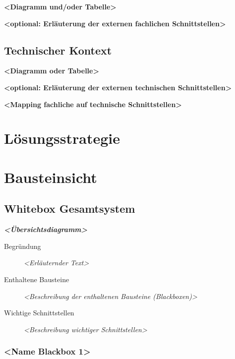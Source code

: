 \documentclass[
]{article}
\begin{document}
\textbf{\textless Diagramm und/oder Tabelle\textgreater{}}

\textbf{\textless optional: Erläuterung der externen fachlichen
Schnittstellen\textgreater{}}

\hypertarget{_technischer_kontext}{%
\subsection{Technischer Kontext}\label{_technischer_kontext}}

\textbf{\textless Diagramm oder Tabelle\textgreater{}}

\textbf{\textless optional: Erläuterung der externen technischen
Schnittstellen\textgreater{}}

\textbf{\textless Mapping fachliche auf technische
Schnittstellen\textgreater{}}

\hypertarget{section-solution-strategy}{%
\section{Lösungsstrategie}\label{section-solution-strategy}}

\hypertarget{section-building-block-view}{%
\section{Bausteinsicht}\label{section-building-block-view}}

\hypertarget{_whitebox_gesamtsystem}{%
\subsection{Whitebox Gesamtsystem}\label{_whitebox_gesamtsystem}}

\emph{\textbf{\textless Übersichtsdiagramm\textgreater{}}}

\begin{description}
\item[Begründung]
\emph{\textless Erläuternder Text\textgreater{}}
\item[Enthaltene Bausteine]
\emph{\textless Beschreibung der enthaltenen Bausteine
(Blackboxen)\textgreater{}}
\item[Wichtige Schnittstellen]
\emph{\textless Beschreibung wichtiger Schnittstellen\textgreater{}}
\end{description}

\hypertarget{__name_blackbox_1}{%
\subsubsection{\textless Name Blackbox
1\textgreater{}}\label{__name_blackbox_1}}
\end{document}
